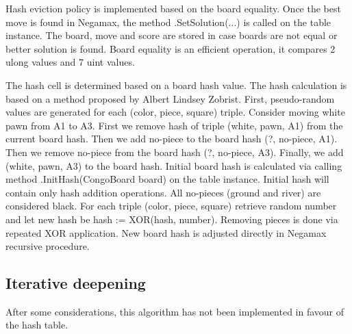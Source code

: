 \vspace{0.5em}

Hash eviction policy is implemented based on the board equality. Once the best
move is found in Negamax, the method \textsf{.SetSolution(...)} is called on
the table instance. The board, move and score are stored in case boards are
not equal or better solution is found. Board equality is an efficient
operation, it compares 2 \textsf{ulong} values and 7 \textsf{uint} values.

\vspace{0.5em}

The hash cell is determined based on a board hash value. The hash calculation
is based on a method proposed by Albert Lindsey Zobrist. First, pseudo-random
values are generated for each (color, piece, square) triple. Consider moving
white pawn from \textsf{A1} to \textsf{A3}. First we remove hash of triple
(white, pawn, A1) from the current board hash. Then we add no-piece to the
board hash (?, no-piece, A1). Then we remove no-piece from the board hash (?,
no-piece, A3). Finally, we add (white, pawn, A3) to the board hash. Initial
board hash is calculated via calling method \textsf{.InitHash(CongoBoard
board)} on the table instance. Initial hash will contain only hash addition
operations. All no-pieces (ground and river) are considered black. For each
triple (color, piece, square) retrieve random number and let new hash be
\textsf{hash := XOR(hash, number)}. Removing pieces is done via repeated
\textsf{XOR} application. New board hash is adjusted directly in Negamax
recursive procedure.

\subsection{Iterative deepening}

\vspace{0.5em}

After some considerations, this algorithm has not been implemented in favour
of the hash table.
